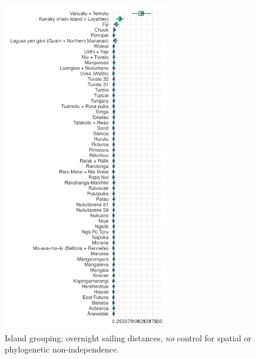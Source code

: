\documentclass[unnumsec,webpdf,modern,medium]{oup-authoring-template}
\begin{document}
\begin{figure}[ht]
\includegraphics[width=0.65\textwidth]{brms_predict_SBZR_control_none.png}
\caption{Island grouping: overnight sailing distances, \emph{no} control for spatial or phylogenetic non-independence.}
\label{
brms_predict_SBZR_control_none}
\end{figure}
\end{document}
